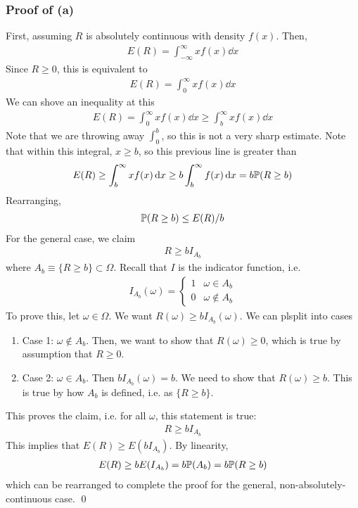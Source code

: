 \subsubsection{Proof of (a)}
First, assuming $R$ is absolutely continuous with density $f(x)$. Then,
\begin{align}
    E(R) = \int_{-\infty}^\infty x f(x) \dd{x}
\end{align}
Since $R \ge 0$, this is equivalent to
\begin{align}
    E(R) = \int_{0}^\infty x f(x) \dd{x}
\end{align}
We can shove an inequality at this
\begin{align}
    E(R) = \int_{0}^\infty x f(x) \dd{x}\ge \int_b^\infty x f(x) \dd{x}
\end{align}
Note that we are throwing away $\int_0^b$, so this is not a very sharp estimate. Note that within this integral, $x \ge b$, so this previous line is greater than
\begin{align}
    E(R) \ge \int_b^\infty x f(x) \dd{x} \ge b\int_b^\infty f(x) \dd{x} = b \mathbb{P}(R \ge b)
\end{align}
Rearranging,
\begin{align}
    \mathbb{P}(R \ge b) \le E(R)/b
\end{align}
For the general case, we claim
\begin{align}
    R \ge b I_{A_b}
\end{align}
where $A_b \equiv \{ R \ge b \} \subset \Omega$. Recall that $I$ is the indicator function, i.e.
\begin{align}
    I_{A_b}(\omega) = \begin{cases}
        1 & \omega \in A_b\\
        0 & \omega \notin A_b
    \end{cases}
\end{align}
To prove this, let $\omega \in \Omega$. We want $R(\omega) \ge b I_{A_b}(\omega)$. We can plsplit into cases
\begin{enumerate}
    \item Case 1: $\omega \notin A_b$. Then, we want to show that $R(\omega) \ge 0$, which is true by assumption that $R \ge 0$.
    \item Case 2: $\omega \in A_b$. Then $b I_{A_b}(\omega) = b$. We need to show that $R(\omega) \ge b$. This is true by how $A_b$ is defined, i.e. as $\{ R \ge b \}$.
\end{enumerate}
This proves the claim, i.e. for all $\omega$, this statement is true:
\begin{align}
    R \ge b I_{A_b}
\end{align}
This implies that $E(R) \ge E(b I_{A_b})$. By linearity,
\begin{align}
    E(R) \ge b E\qty(I_{A_b}) = b\mathbb{P}(A_b) = b \mathbb{P}(R \ge b)
\end{align}
which can be rearranged to complete the proof for the general, non-absolutely-continuous case.
\qed

